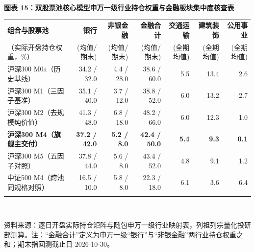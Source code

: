 \documentclass[12pt,a4paper]{article}
\newcommand{\exhibitcap}[1]{{\sffamily\bfseries\fontsize{9.6pt}{12.5pt}\selectfont\textcolor{Primary}{#1}}\\[2pt]}
\newcommand{\exhibitnote}[1]{{\fontsize{7.5pt}{10pt}\selectfont\color{GrayNote}#1\par}}
\begin{document}
\vspace{4pt}
\noindent\begin{minipage}{\textwidth}
\setlength{\parindent}{0pt}\setlength{\tabcolsep}{3.8pt}
\exhibitcap{图表 15：双股票池核心模型申万一级行业持仓权重与金融板块集中度核查表}
\fontsize{7.8pt}{10.6pt}\selectfont
\begin{tabularx}{\textwidth}{@{}X r r r r r r@{}}
  \arrayrulecolor{Primary}\toprule[1.0pt]
  \rowcolor{TblHdr}
  \textbf{\sffamily 组合与股票池} & \textbf{\sffamily 银行} & \textbf{\sffamily 非银金融} & \textbf{\sffamily 金融合计} & \textbf{\sffamily 交通运输} & \textbf{\sffamily 建筑装饰} & \textbf{\sffamily 公用事业} \\
  \rowcolor{TblHdr}
  {\fontsize{6.5}{8}\selectfont\textcolor{GrayNote}{（实际开盘持仓权重，\%）}} &
  {\fontsize{6.5}{8}\selectfont\textcolor{GrayNote}{(均值/期末)}} &
  {\fontsize{6.5}{8}\selectfont\textcolor{GrayNote}{(均值/期末)}} &
  {\fontsize{6.5}{8}\selectfont\textcolor{GrayNote}{(均值/期末)}} &
  {\fontsize{6.5}{8}\selectfont\textcolor{GrayNote}{(全期均值)}} &
  {\fontsize{6.5}{8}\selectfont\textcolor{GrayNote}{(全期均值)}} &
  {\fontsize{6.5}{8}\selectfont\textcolor{GrayNote}{(全期均值)}} \\
  \midrule[0.5pt]
    沪深300 M0a（历史基线） & 34.2 / 32.0 & 4.4 / 28.0 & 38.6 / 60.0 & 5.5 & 13.4 & 2.6 \\
    沪深300 M1（三因子基准） & 35.1 / 40.0 & 3.7 / 12.0 & 38.8 / 52.0 & 6.0 & 13.2 & 2.7 \\
    沪深300 M2（去规模纯价值） & 41.3 / 48.0 & 6.8 / 18.0 & 48.2 / 66.0 & 6.0 & 12.3 & 1.0 \\
    \textbf{\textcolor{Primary}{沪深300 M4（旗舰主交付）}} & \textbf{37.2 / 42.0} & \textbf{5.2 / 8.0} & \textbf{\textcolor{Primary}{42.4 / 50.0}} & \textbf{5.4} & \textbf{9.3} & \textbf{0.1} \\
    沪深300 M5（五因子对照） & 37.8 / 44.0 & 5.6 / 8.0 & 43.4 / 52.0 & 4.8 & 9.1 & 1.2 \\
    \arrayrulecolor{RuleMuted}\midrule[0.35pt]
    中证500 M4（跨池同规格对照） & 16.5 / 10.0 & 5.8 / 8.0 & 22.3 / 18.0 & 6.1 & 3.6 & 6.4 \\
  \arrayrulecolor{Primary}\bottomrule[1.0pt]
\end{tabularx}\\[3pt]
\exhibitnote{资料来源：逐日开盘实际持仓矩阵与随包申万一级行业映射表，列祖列宗量化投研部测算。注：“金融合计”定义为申万一级“银行”与“非银金融”两行业持仓权重之和；期末指回测截止日 2026-10-30。}
\end{minipage}
\vspace{5pt}
\end{document}
